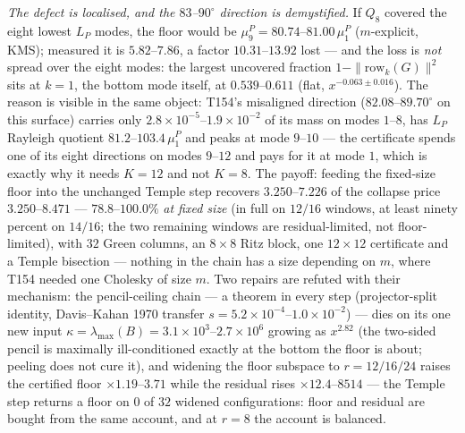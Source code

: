 \documentclass[11pt,a4paper]{article}
\begin{document}
\emph{The defect is localised, and the $83$--$90^\circ$ direction is demystified.} If $Q_8$
covered the eight lowest $L_P$ modes, the floor would be $\mu^P_9=80.74$--$81.00\,\mu^P_1$
($m$-explicit, KMS); measured it is $5.82$--$7.86$, a factor $10.31$--$13.92$ lost --- and
the loss is \emph{not} spread over the eight modes: the largest uncovered fraction
$1-\|\mathrm{row}_k(G)\|^2$ sits at $k=1$, the bottom mode itself, at
$\mathbf{0.539}$--$\mathbf{0.611}$ (flat, $x^{-0.063\pm0.016}$). The reason is visible in
the same object: T154's misaligned direction ($82.08$--$89.70^\circ$ on this surface)
carries only $2.8\times10^{-5}$--$1.9\times10^{-2}$ of its mass on modes $1$--$8$, has
$L_P$ Rayleigh quotient $81.2$--$103.4\,\mu^P_1$ and peaks at mode $9$--$10$ --- the
certificate spends one of its eight directions on modes $9$--$12$ and pays for it at mode
$1$, which is exactly why it needs $K=12$ and not $K=8$. The payoff: feeding the fixed-size
floor into the unchanged Temple step recovers $3.250$--$7.226$ of the collapse price
$3.250$--$8.471$ --- $\mathbf{78.8}$--$\mathbf{100.0\%}$ \emph{at fixed size} (in full on
$12/16$ windows, at least ninety percent on $14/16$; the two remaining windows are
residual-limited, not floor-limited), with $32$ Green columns, an $8\times8$ Ritz block,
one $12\times12$ certificate and a Temple bisection --- nothing in the chain has a size
depending on $m$, where T154 needed one Cholesky of size $m$. Two repairs are refuted with
their mechanism: the pencil-ceiling chain --- a theorem in every step (projector-split
identity, Davis--Kahan 1970 transfer $s=5.2\times10^{-4}$--$1.0\times10^{-2}$) --- dies on
its one new input $\kappa=\lambda_{\max}(B)=3.1\times10^{3}$--$2.7\times10^{6}$ growing as
$x^{2.82}$ (the two-sided pencil is maximally ill-conditioned exactly at the bottom the
floor is about; peeling does not cure it), and widening the floor subspace to
$r=12/16/24$ raises the certified floor $\times1.19$--$3.71$ while the residual rises
$\times12.4$--$8514$ --- the Temple step returns a floor on $0$ of $32$ widened
configurations: floor and residual are bought from the same account, and at $r=8$ the
account is balanced.
\end{document}

